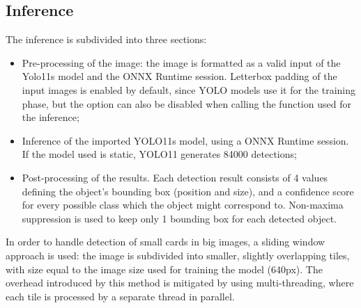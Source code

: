 \subsection{Inference}
The inference is subdivided into three sections:
\begin{itemize}
    \item Pre-processing of the image: the image is formatted as a valid input of the Yolo11s model and the ONNX Runtime session. 
    Letterbox padding of the input images is enabled by default, since YOLO models use it for the training phase, but the option 
    can also be disabled when calling the function used for the inference;
    \item Inference of the imported YOLO11s model, using a ONNX Runtime session. If the model used is static, YOLO11 generates 84000 detections;
    \item Post-processing of the results. Each detection result consists of 4 values defining the object's bounding box (position and size), and 
    a confidence score for every possible class which the object might correspond to. Non-maxima suppression is used to keep only 1 bounding box 
    for each detected object.
\end{itemize}
In order to handle detection of small cards in big images, a sliding window approach is used: the image is subdivided into smaller, slightly 
overlapping tiles, with size equal to the image size used for training the model (640px). The overhead introduced by this method is mitigated 
by using multi-threading, where each tile is processed by a separate thread in parallel.

